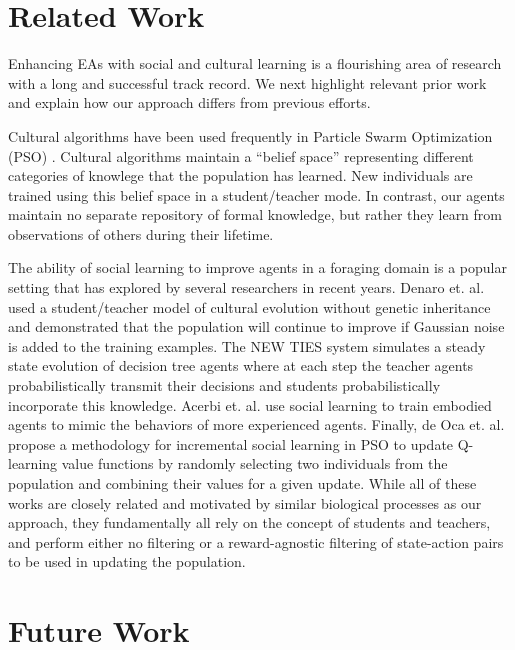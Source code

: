 \documentclass{acm_proc_article-sp}
\begin{document}
\section{Related Work}
\label{sec:related}
Enhancing EAs with social and cultural learning is a flourishing area of research with a long and successful track record.
We next highlight relevant prior work and explain how our approach differs from previous efforts.

Cultural algorithms \cite{reynolds1994introduction} have been used frequently in Particle Swarm Optimization (PSO) \cite{kennedy1995particle}. Cultural algorithms maintain a ``belief space'' representing different categories of knowlege that the population has learned. New individuals are trained using this belief space in a student/teacher mode. In contrast, our agents maintain no separate repository of formal knowledge, but rather they learn from observations of others during their lifetime.

The ability of social learning to improve agents in a foraging domain is a popular setting that has explored by several researchers in recent years. Denaro et. al. \cite{denaro1996cultural} used a student/teacher model of cultural evolution without genetic inheritance and demonstrated that the population will continue to improve if Gaussian noise is added to the training examples. The NEW TIES system \cite{haasdijk2008social, vogt2010modeling} simulates a steady state evolution of decision tree agents where at each step the teacher agents probabilistically transmit their decisions and students probabilistically incorporate this knowledge. Acerbi et. al. \cite{acerbi2007social} use social learning to train embodied agents to mimic the behaviors of more experienced agents. Finally, de Oca et. al. \cite{de2011incremental} propose a methodology for incremental social learning in PSO to update Q-learning \cite{watkins1992q} value functions by randomly selecting two individuals from the population and combining their values for a given update. While all of these works are closely related and motivated by similar biological processes as our approach, they fundamentally all rely on the concept of students and teachers, and perform either no filtering or a reward-agnostic filtering of state-action pairs to be used in updating the population.

\section{Future Work}
\label{sec:future}
\end{document}
